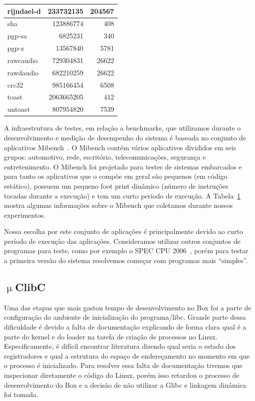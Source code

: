 \documentclass[11pt,twoside]{article}
\begin{document}
\begin{table}
\begin{center}
\begin{tabular}{|l|r|r|}
    rijndael-d & 233732135 & 204567 \\ \hline
    sha & 123886774 & 408 \\ \hline
    pgp-sa & 6825231 & 340 \\ \hline
    pgp-z & 13567840 & 5781 \\ \hline
    rawcaudio & 729304831 & 26622 \\ \hline
    rawdaudio & 682210259 & 26622 \\ \hline
    crc32 & 985166454 & 6508 \\ \hline
    toast & 2063665205 & 412 \\ \hline
    untoast & 807954820 & 7539 \\ \hline
  \end{tabular}
  \label{tab:mibench}
 \end{center}
\end{table}

A infraestrutura de testes, em relação a benchmarks, que utilizamos durante o
desenvolvimento e medição de desempenho do sistema é baseada no conjunto de
aplicativos Mibench~\cite{mibench}. O Mibench contém vários aplicativos
divididos em seis grupos: automotivo, rede, escritório, telecomunicações,
segurança e entretenimento. O Mibench foi projetado para testes de sistemas
embarcados e para tanto os aplicativos que o compõe em geral são pequenos (em
código estático), possuem um pequeno foot print dinâmico (número de instruções
tocadas durante a execução) e tem um curto período de execução. A 
Tabela~\ref{tab:mibench} mostra algumas informações sobre o Mibench que 
coletamos durante nossos experimentos.

Nossa escolha por este conjunto de aplicações é principalmente devido ao curto
período de execução das aplicações. Consideramos utilizar outros conjuntos de
programas para teste, como por exemplo o SPEC CPU 2006~\cite{spec2006}, porém
para testar a primeira versão do sistema resolvemos começar com programas mais
``simples''.

\subsection{$\upmu$ClibC}

Uma das etapas que mais gastou tempo de desenvolvimento no Box foi a parte de
configuração do ambiente de inicialização do programa/libc.  Grande parte dessa
dificuldade é devido a falta de documentação explicando de forma clara qual é a
parte do kernel e do loader na tarefa de criação de processos no
Linux. Especificamente, é difícil encontrar literatura dizendo qual seria o
estado dos registradores e qual a estrutura do espaço de endereçamento no
momento em que o processo é inicializado. Para resolver essa falta de
documentação tivemos que inspecionar diretamente o código do Linux, porém isso
retardou o processo de desenvolvimento do Box e a decisão de não utilizar a
Glibc e linkagem dinâmica foi tomada.
\end{document}
